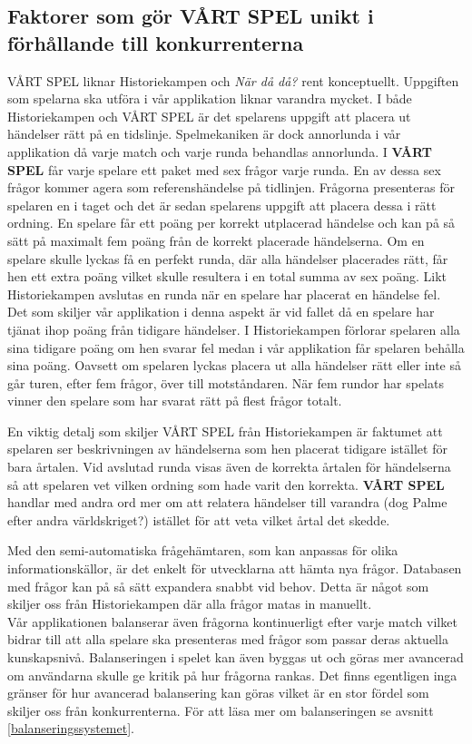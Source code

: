 \documentclass[a4paper, 11pt]{article}
\begin{document}
\subsection{Faktorer som gör VÅRT SPEL unikt i förhållande till konkurrenterna}
VÅRT SPEL liknar Historiekampen och \textit{När då då?} rent konceptuellt. Uppgiften som spelarna ska utföra i vår applikation liknar varandra mycket. I både Historiekampen och VÅRT SPEL är det spelarens uppgift att placera ut händelser rätt på en tidslinje. Spelmekaniken är dock annorlunda i vår applikation då varje match och varje runda behandlas annorlunda. I \textbf{VÅRT SPEL} får varje spelare ett paket med sex frågor varje runda. En av dessa sex frågor kommer agera som referenshändelse på tidlinjen. Frågorna presenteras för spelaren en i taget och det är sedan spelarens uppgift att placera dessa i rätt ordning. En spelare får ett poäng per korrekt utplacerad händelse och kan på så sätt på maximalt fem poäng från de korrekt placerade händelserna. Om en spelare skulle lyckas få en perfekt runda, där alla händelser placerades rätt, får hen ett extra poäng vilket skulle resultera i en total summa av sex poäng. Likt Historiekampen avslutas en runda när en spelare har placerat en händelse fel. Det som skiljer vår applikation i denna aspekt är vid fallet då en spelare har tjänat ihop poäng från tidigare händelser. I Historiekampen förlorar spelaren alla sina tidigare poäng om hen svarar fel medan i vår applikation får spelaren behålla sina poäng. Oavsett om spelaren lyckas placera ut alla händelser rätt eller inte så går turen, efter fem frågor, över till motståndaren. När fem rundor har spelats vinner den spelare som har svarat rätt på flest frågor totalt.  

En viktig detalj som skiljer VÅRT SPEL från Historiekampen är faktumet att spelaren ser beskrivningen av händelserna som hen placerat tidigare istället för bara årtalen. Vid avslutad runda visas även de korrekta årtalen för händelserna så att spelaren vet vilken ordning som hade varit den korrekta. \textbf{VÅRT SPEL} handlar med andra ord mer om att relatera händelser till varandra (dog Palme efter andra världskriget?) istället för att veta vilket årtal det skedde.

Med den semi-automatiska frågehämtaren, som kan anpassas för olika informationskällor, är det enkelt för utvecklarna att hämta nya frågor. Databasen med frågor kan på så sätt expandera snabbt vid behov. Detta är något som skiljer oss från Historiekampen där alla frågor matas in manuellt. \\
Vår applikationen balanserar även frågorna kontinuerligt efter varje match vilket bidrar till att alla spelare ska presenteras med frågor som passar deras aktuella kunskapsnivå. Balanseringen i spelet kan även byggas ut och göras mer avancerad om användarna skulle ge kritik på hur frågorna rankas. Det finns egentligen inga gränser för hur avancerad balansering kan göras vilket är en stor fördel som skiljer oss från konkurrenterna. För att läsa mer om balanseringen se avsnitt \ref{balanseringssystemet}.
\end{document}
